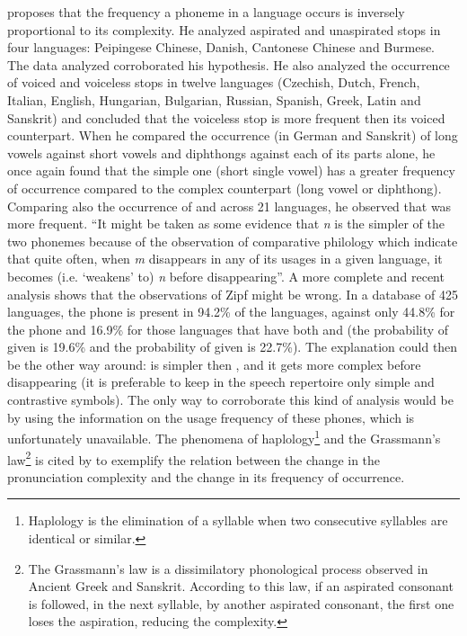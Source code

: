 \cite{zipf1949} proposes that the frequency a phoneme in a language occurs is inversely proportional to its complexity. He analyzed aspirated and unaspirated stops in four languages: Peipingese Chinese, Danish, Cantonese Chinese and Burmese. The data analyzed corroborated his hypothesis. He also analyzed the occurrence of voiced and voiceless stops in twelve languages (Czechish, Dutch, French, Italian, English, Hungarian, Bulgarian, Russian, Spanish, Greek, Latin and Sanskrit) and concluded that the voiceless stop is more frequent then its voiced counterpart. When he compared the occurrence (in German and Sanskrit) of long vowels against short vowels and diphthongs against each of its parts alone, he once again found that the simple one (short single vowel) has a greater frequency of occurrence compared to the complex counterpart (long vowel or diphthong). Comparing also the occurrence of \textipa{[m]} and \textipa{[n]} across 21 languages, he observed that \textipa{[n]} was more frequent. ``It might be taken as some evidence that \textit{n} is the simpler of the two phonemes because of the observation of comparative philology which indicate that quite often, when \textit{m} disappears in any of its usages in a given language, it becomes (i.e. `weakens' to) \textit{n} before disappearing''\citep{zipf1949}. A more complete and recent analysis \citep{maddieson1884} shows that the observations of Zipf might be wrong. In a database of 425 languages, the phone \textipa{[m]} is present in 94.2\% of the languages, against only 44.8\% for the phone \textipa{[n]} and 16.9\% for those languages that have both \textipa{[m]} and \textipa{[n]} (the probability of \textipa{[m]} given \textipa{[n]} is 19.6\% and the probability of \textipa{[n]} given \textipa{[m]} is 22.7\%). The explanation could then be the other way around: \textipa{[m]} is simpler then \textipa{[n]}, and it gets more complex before disappearing (it is preferable to keep in the speech repertoire only simple and contrastive symbols). The only way to corroborate this kind of analysis would be by using the information on the usage frequency of these phones, which is unfortunately unavailable. The phenomena of haplology\footnote{Haplology is the elimination of a syllable when two consecutive syllables are identical or similar.} and the Grassmann's law\footnote{The Grassmann's law is a dissimilatory phonological process observed in Ancient Greek and Sanskrit. According to this law, if an aspirated consonant is followed, in the next syllable, by another aspirated consonant, the first one loses the aspiration, reducing the complexity.} is cited by \cite{zipf1949} to exemplify the relation between the change in the pronunciation complexity  and the change in its frequency of occurrence.

